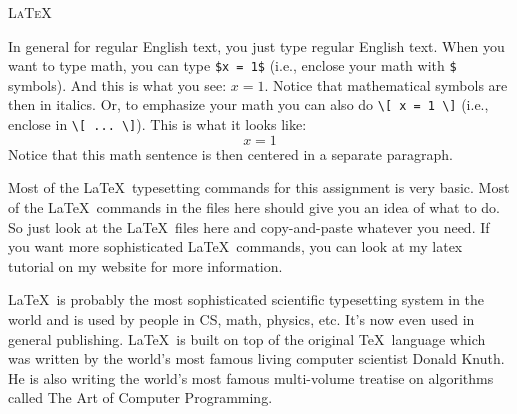 \textsc{\LaTeX\ }


In general for regular English text, you just type regular English text.
When you want to type math, you can type \verb!$x = 1$! (i.e., enclose
your math with \verb!$! symbols).
And this is what you see: $x = 1$.
Notice that mathematical symbols are then in italics.
Or, to emphasize your math you can also do \verb!\[ x = 1 \]! (i.e.,
enclose in \verb!\[ ... \]!).
This is what it looks like:
\[
x = 1
\]
Notice that this math sentence is then centered in a separate paragraph.

Most of the \LaTeX\ typesetting commands for this assignment
is very basic.
Most of the \LaTeX\ commands in the files here should give you an idea
of what to do.
So just look at the \LaTeX\ files here and copy-and-paste whatever you need.
If you want more sophisticated \LaTeX\ commands,
you can look at my latex tutorial on my website for more information.

\LaTeX\ is probably the most sophisticated scientific typesetting
system in the world and is used by people in CS, math, physics, etc.
It's now even used in general publishing.
\LaTeX\ is built on top of the original \TeX\ language which was written by
the world's most famous living computer scientist Donald Knuth.
He is also writing the world's most famous multi-volume treatise on
algorithms called The Art of Computer Programming.
